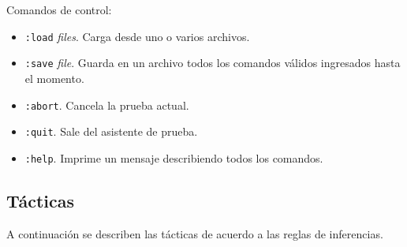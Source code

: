 \documentclass[a4paper,11pt]{article}
\theoremstyle{definition}
\begin{document}
Comandos de control: 

\begin{itemize}

\item \texttt{:load} \textit{files}. Carga desde uno o varios archivos.

\item \texttt{:save} \textit{file}. Guarda en un archivo todos los comandos válidos ingresados hasta el momento.

\item \texttt{:abort}. Cancela la prueba actual.

\item \texttt{:quit}. Sale del asistente de prueba.

\item \texttt{:help}. Imprime un mensaje describiendo todos los comandos.

\end{itemize}


\subsection{Tácticas}
\label{tácticas}

A continuación se describen las tácticas de acuerdo a las reglas de inferencias.
\end{document}
